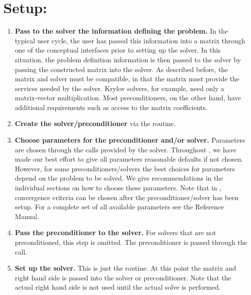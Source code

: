 
\section*{Setup:}

\begin{enumerate}

\item
{\bf Pass to the solver the information defining the problem.} In the
typical user cycle, the user has passed this information into a matrix
through one of the conceptual interfaces prior to setting up the
solver. In this situation, the problem definition information is then
passed to the solver by passing the constructed matrix into the
solver. As described before, the matrix and solver must be compatible,
in that the matrix must provide the services needed by the
solver. Krylov solvers, for example, need only a matrix-vector
multiplication.  Most preconditioners, on the other hand, have
additional requirements such as access to the matrix coefficients.

\item
{\bf Create the solver/preconditioner} via the  routine.

\item
{\bf Choose parameters for the preconditioner and/or solver.}
Parameters are chosen through the  calls provided by the
solver.  Throughout \hypre{}, we have made our best effort to
give all parameters reasonable defaults if not chosen.  However, 
for some preconditioners/solvers the best choices for parameters
depend on the problem to be solved. We give recommendations in the
individual sections on how to choose these parameters.
Note that in \hypre{}, convergence
criteria can be chosen after the preconditioner/solver has been setup.
For a complete set of all available parameters see the Reference Manual.

\item
{\bf Pass the preconditioner to the solver.} For solvers that are not
preconditioned, this step is omitted.  The preconditioner is passed
through the  call.

\item
{\bf Set up the solver.} This is just the  routine.
At this point the matrix and right hand side is passed into the solver
or preconditioner. Note that the actual right hand side is not used
until the actual solve is performed.

\end{enumerate}

